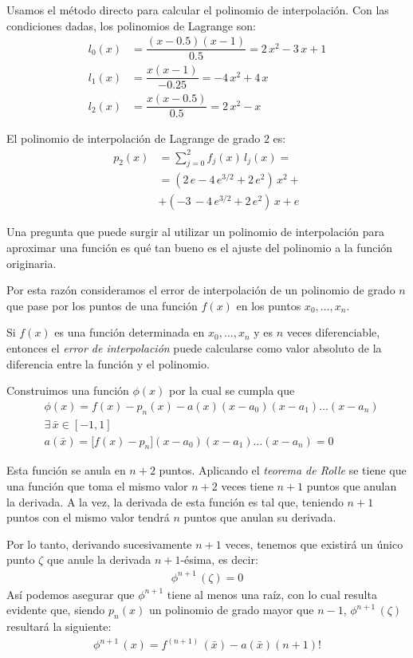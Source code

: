 Usamos el método directo para calcular el polinomio de interpolación. Con las condiciones dadas, los polinomios de Lagrange son:
\begin{align*}
l_{0} (x) &= \dfrac{(x - 0.5)(x - 1)}{0.5} = 2 \, x^{2} - 3 \, x + 1 \\[0.5em]
l_{1} (x) &= \dfrac{x (x - 1)}{-0.25} = - 4 \, x^{2} + 4 \, x \\[0.5em]
l_{2} (x) &= \dfrac{x (x - 0.5)}{0.5} = 2 \, x^{2} - x
\end{align*}

El polinomio de interpolación de Lagrange de grado $2$ es:
\begin{align*}
p_{2}(x) &= \sum_{j=0}^{2} f_{j}(x) \, l_{j}(x) = \\[0.5em]
&= (2 \, e - 4 \, e^{3/2} + 2 \, e^{2}) \, x^{2} + \\[0.5em]
&+ (-3 \, - 4 \, e^{3/2} + 2 \, e^{2}) \, x + e
\end{align*}

Una pregunta que puede surgir al utilizar un polinomio de interpolación para aproximar una función es qué tan bueno es el ajuste del polinomio a la función originaria.
\par
Por esta razón consideramos el error de interpolación de un polinomio de grado $n$ que pase por los puntos de una función $f(x)$ en los puntos $x_{0}, \ldots, x_{n}$.
\par
Si $f(x)$ es una función determinada en $x_{0}, \ldots, x_{n}$ y es $n$ veces diferenciable, entonces el \emph{error de interpolación} puede calcularse como valor absoluto de la diferencia entre la función y el polinomio.
\par
Construimos una función $\phi(x)$ por la cual se cumpla que
\begin{align*}
&\phi(x) = f(x) {-} p_{n}(x) {-} a(x)(x {-} a_{0})(x {-} a_{1}) \ldots (x {-} a_{n}) \\[0.5em]
&\exists \, \bar{x} \in [-1, 1] \\[0.5em]
&a(\bar{x}) = \big[ f(x) {-} p_{n} \big] (x {-} a_{0})(x {-} a_{1}) \ldots (x {-} a_{n}) = 0
\end{align*}

Esta función se anula en $n + 2$ puntos. Aplicando el \emph{teorema de Rolle} se tiene que una función que toma el mismo valor $n + 2$ veces tiene $n + 1$ puntos que anulan la derivada. A la vez, la derivada de esta función es tal que, teniendo $n + 1$ puntos con el mismo valor tendrá $n$ puntos que anulan su derivada. 
\par
Por lo tanto, derivando sucesivamente $n + 1$ veces, tenemos que existirá un único punto $\zeta$ que anule la derivada $n+1$-ésima, es decir:
\begin{align*}
\phi^{n+1} \, (\zeta) = 0
\end{align*}
Así podemos asegurar que $\phi^{n+1}$ tiene al menos una raíz, con lo cual resulta evidente que, siendo $p_{n}(x)$ un polinomio de grado mayor que $n - 1$, $\phi^{n+1} \, (\zeta)$ resultará la siguiente:
\begin{align*}
\phi^{n+1} \, (x) = f^{(n+1)} \, (\bar{x}) - a (\bar{x}) (n + 1)!
\end{align*}

